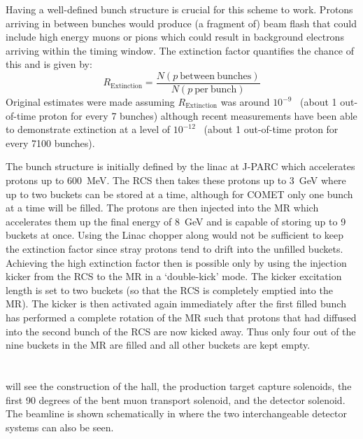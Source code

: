 Having a well-defined bunch structure is crucial for this scheme to work. 
Protons arriving in between bunches would produce (a fragment of) beam flash that could include high energy muons or pions which could result in background electrons arriving within the timing window.
The extinction factor quantifies the chance of this and is given by:
\begin{equation}
	R_\mathrm{Extinction}=\frac{N(p~\mathrm{between~bunches})}{N(p~\mathrm{per~bunch})}
\end{equation}
Original estimates were made assuming $R_\mathrm{Extinction}$ was around $10^{-9}$~\cite{CDRphase2} (about 1 out-of-time proton for every 7 bunches) although recent measurements have been able to demonstrate extinction at a level of $10^{-12}$~\cite{COMETExtinctionNote} (about 1 out-of-time proton for every 7100 bunches).

The bunch structure is initially defined by the linac at J-PARC which accelerates protons up to 600~MeV.
The \ac{RCS} then takes these protons up to 3~GeV where up to two buckets can be stored at a time, although for COMET only one bunch at a time will be filled.
The protons are then injected into the \ac{MR} which accelerates them up the final energy of 8~GeV and is capable of storing up to 9 buckets at once.
Using the Linac chopper along would not be sufficient to keep the extinction factor since stray protons tend to drift into the unfilled buckets.
Achieving the high extinction factor then is possible only by using the injection kicker from the \ac{RCS} to the \ac{MR} in a `double-kick' mode.
The kicker excitation length is set to two buckets (so that the \ac{RCS} is completely emptied into the \ac{MR}).  
The kicker is then activated again immediately after the first filled bunch has performed a complete rotation of the \ac{MR} such that protons that had diffused into the second bunch of the \ac{RCS} are now kicked away.
Thus only four out of the nine buckets in the \ac{MR} are filled and all other buckets are kept empty.

\section{\COMET \phaseI}
\FigPhaseI
\phaseI will see the construction of the \COMET hall, the production target capture solenoids, the first 90 degrees of the bent muon transport solenoid, and the detector solenoid.  
The beamline is shown schematically in  where the two interchangeable detector systems can also be seen.

